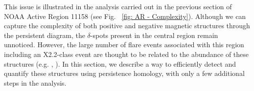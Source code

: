 This issue is illustrated in the analysis carried out in the previous section of NOAA Active Region 11158 (see Fig. ~\ref{fig:  AR - Complexity}). Although we can capture the complexity of both positive and negative magnetic structures through the persistent diagram, the $\delta$-spots present in the central region remain unnoticed. However, the large number of flare events associated with this region including an X2.2-class event are thought to be related to the abundance of these structures (e.g. \citealt{x21}, \citealt{x22}). In this section, we describe a way to efficiently detect and quantify these structures using persistence homology, with only a few additional steps in the analysis.


